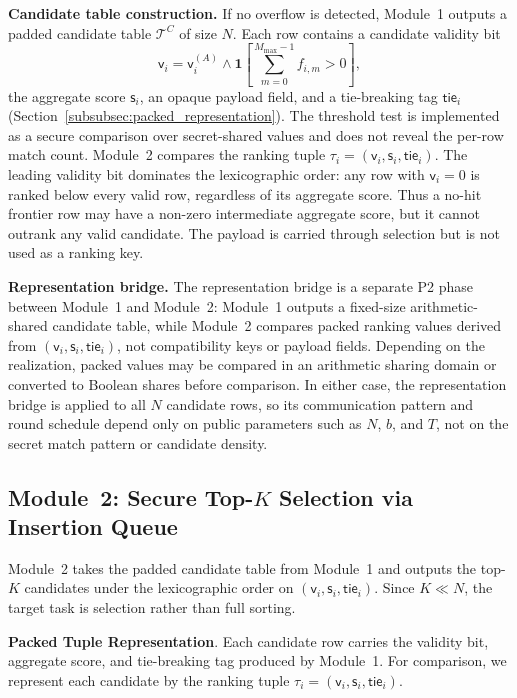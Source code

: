 \documentclass[conference,compsoc,letterpaper]{IEEEtran}
\theoremstyle{definition}
\theoremstyle{remark}
\newcommand{\myparagraph}[1]{\noindent \textbf{#1}.}
\newcommand{\Mmax}{M_{\max}}
\newcommand{\CandidateTable}{\mathcal{T}^{C}}
\newcommand{\valid}{\mathsf{v}}
\newcommand{\score}{\mathsf{s}}
\newcommand{\tie}{\mathsf{tie}}
\begin{document}
\noindent\textbf{Candidate table construction.}
If no overflow is detected, Module~1 outputs a padded candidate table $\CandidateTable$ of size $N$.
Each row contains a candidate validity bit
\[
\valid_i =
\valid_i^{(A)}
\wedge
\mathbf{1}\!\left[
\sum_{m=0}^{\Mmax-1} f_{i,m} > 0
\right],
\]
the aggregate score $\score_i$, an opaque payload field, and a tie-breaking tag $\tie_i$ (Section~\ref{subsubsec:packed_representation}).
The threshold test is implemented as a secure comparison over secret-shared values and does not reveal the per-row match count.
Module~2 compares the ranking tuple $\tau_i=(\valid_i,\score_i,\tie_i)$.
The leading validity bit dominates the lexicographic order: any row with $\valid_i=0$ is ranked below every valid row, regardless of its aggregate score.
Thus a no-hit frontier row may have a non-zero intermediate aggregate score, but it cannot outrank any valid candidate.
The payload is carried through selection but is not used as a ranking key.
\smallskip

\noindent\textbf{Representation bridge.}
The representation bridge is a separate P2 phase between Module~1 and Module~2: Module~1 outputs a fixed-size arithmetic-shared candidate table, while Module~2 compares packed ranking values derived from $(\valid_i,\score_i,\tie_i)$, not compatibility keys or payload fields.
Depending on the realization, packed values may be compared in an arithmetic sharing domain or converted to Boolean shares before comparison.
In either case, the representation bridge is applied to all $N$ candidate rows, so its communication pattern and round schedule depend only on public parameters such as $N$, $b$, and $T$, not on the secret match pattern or candidate density.

\subsection{Module~2: Secure Top-$K$ Selection via Insertion Queue}
\label{subsec:module2}

Module~2 takes the padded candidate table from Module~1 and outputs the top-$K$ candidates under the lexicographic order on $(\valid_i,\score_i,\tie_i)$.
Since $K\ll N$, the target task is selection rather than full sorting.
\smallskip

\myparagraph{Packed Tuple Representation}
\label{subsubsec:packed_representation}
Each candidate row carries the validity bit, aggregate score, and tie-breaking tag produced by Module~1.
For comparison, we represent each candidate by the ranking tuple $\tau_i=(\valid_i,\score_i,\tie_i)$.
\end{document}
